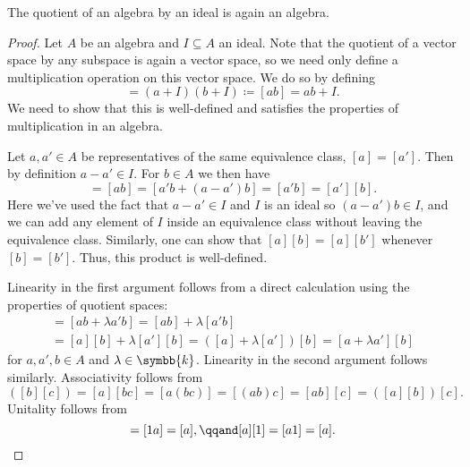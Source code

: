 \documentclass[fleqn]{NotesClass}
\renewcommand{\field}{\symbb{k}}
\begin{document}
    \begin{lma}{}{}
        The quotient of an algebra by an ideal is again an algebra.
        \begin{proof}
            Let \(A\) be an algebra and \(I \subseteq A\) an ideal.
            Note that the quotient of a vector space by any subspace is again a vector space, so we need only define a multiplication operation on this vector space.
            We do so by defining
            \begin{equation}
                [a][b] = (a + I)(b + I) \coloneq [ab] = ab + I.
            \end{equation}
            We need to show that this is well-defined and satisfies the properties of multiplication in an algebra.
            
            Let \(a, a' \in A\) be representatives of the same equivalence class, \([a] = [a']\).
            Then by definition \(a - a' \in I\).
            For \(b \in A\) we then have
            \begin{equation}
                [a][b] = [ab] = [a'b + (a - a')b] = [a'b] = [a'][b].
            \end{equation}
            Here we've used the fact that \(a - a' \in I\) and \(I\) is an ideal so \((a - a')b \in I\), and we can add any element of \(I\) inside an equivalence class without leaving the equivalence class.
            Similarly, one can show that \([a][b] = [a][b']\) whenever \([b] = [b']\).
            Thus, this product is well-defined.
            
            Linearity in the first argument follows from a direct calculation using the properties of quotient spaces:
            \begin{multline}
                [(a + \lambda a')b] = [a b + \lambda a' b] = [ab] + \lambda [a' b]\\
                = [a][b] + \lambda [a'][b]= ([a] + \lambda[a'])[b] = [a + \lambda a'][b]
            \end{multline}
            for \(a, a', b \in A\) and \(\lambda \in \field\).
            Linearity in the second argument follows similarly.
            Associativity follows from
            \begin{equation}
                [a]([b][c]) = [a][bc] = [a(bc)] = [(ab)c] = [ab][c] = ([a][b])[c].
            \end{equation}
            Unitality follows from
            \begin{equation}
                [1][a] = [1a] = [a], \qqand [a][1] = [a1] = [a].
            \end{equation}
        \end{proof}
    \end{lma}
    
\end{document}
